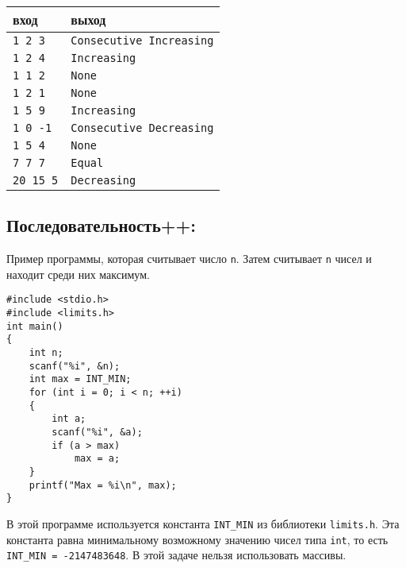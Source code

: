 \documentclass[10pt]{article}
\begin{document}
\begin{center}
\begin{tabular}{ l l }
 вход & выход \\ \hline
 \texttt{1 2 3} & \texttt{Consecutive Increasing}  \\ 
 \texttt{1 2 4} & \texttt{Increasing}  \\
 \texttt{1 1 2} & \texttt{None} \\ 
 \texttt{1 2 1} & \texttt{None} \\ 
 \texttt{1 5 9} & \texttt{Increasing}  \\ 
 \texttt{1 0 -1} & \texttt{Consecutive Decreasing}  \\ 
 \texttt{1 5 4} & \texttt{None} \\ 
 \texttt{7 7 7} & \texttt{Equal} \\  
 \texttt{20 15 5} & \texttt{Decreasing} \\
\end{tabular}
\end{center}


\subsection{Последовательность++:} 
Пример программы, которая считывает число \texttt{n}. Затем считывает \texttt{n} чисел и находит среди них максимум. 

\begin{lstlisting}
#include <stdio.h>
#include <limits.h>
int main() 
{
    int n;
    scanf("%i", &n);
    int max = INT_MIN;
    for (int i = 0; i < n; ++i) 
    {
        int a;
        scanf("%i", &a);
        if (a > max)
            max = a;
    }
    printf("Max = %i\n", max);
}
\end{lstlisting}
В этой программе используется константа \texttt{INT\_MIN} из библиотеки \texttt{limits.h}. Эта константа равна минимальному возможному значению чисел типа \texttt{int}, то есть \texttt{INT\_MIN = -2147483648}. В этой задаче нельзя использовать массивы.
\end{document}
